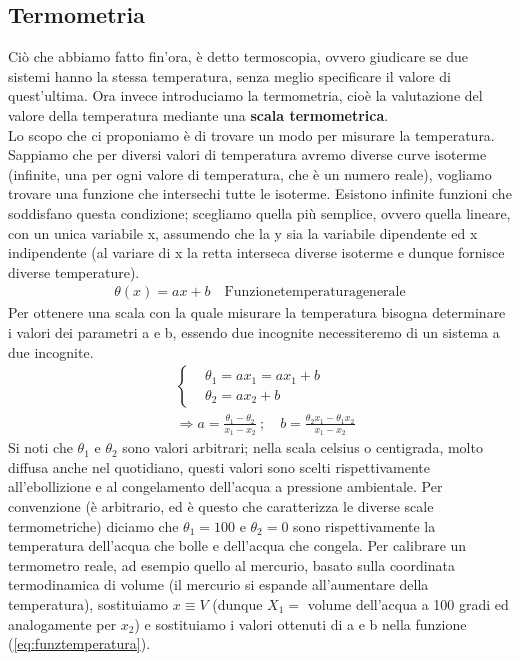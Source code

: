 \documentclass[10pt,a4paper]{article}
\begin{document}
\subsection{Termometria}
Ciò che abbiamo fatto fin'ora, è detto termoscopia, ovvero giudicare se due sistemi hanno la stessa temperatura, senza meglio specificare il valore di quest'ultima. Ora invece introduciamo la termometria, cioè la valutazione del valore della temperatura mediante una \textbf{scala termometrica}. \\
Lo scopo che ci proponiamo è di trovare un modo per misurare la temperatura. Sappiamo che per diversi valori di temperatura avremo diverse curve isoterme (infinite, una per ogni valore di temperatura, che è un numero reale), vogliamo trovare una funzione che intersechi tutte le isoterme. Esistono infinite funzioni che soddisfano questa condizione; scegliamo quella più semplice, ovvero quella lineare, con un unica variabile x, assumendo che la y sia la variabile dipendente ed x indipendente (al variare di x la retta interseca diverse isoterme e dunque fornisce diverse temperature).
\begin{align}\label{eq:funztemperatura}
	\theta (x) = a x + b \quad \text{Funzionetemperaturagenerale}
\end{align}  
Per ottenere una scala con la quale misurare la temperatura bisogna determinare i valori dei parametri a e b, essendo due incognite necessiteremo di un sistema a due incognite. 
\begin{align*} 
&\begin{cases}
	&\theta_1 = a x_1 = a x_1 + b\\
	&\theta_2 = a x_2 + b  
\end{cases}\\
&\Rightarrow a = \frac{\theta_1 - \theta_2}{x_1 - x_2}\ ; \quad b = \frac{\theta_2 x_1 - \theta_1 x_2}{x_1 - x_2 }
\end{align*} 
Si noti che $\theta_1$ e $\theta_2$ sono valori arbitrari; nella scala celsius o centigrada, molto diffusa anche nel quotidiano, questi valori sono scelti rispettivamente all'ebollizione e al congelamento dell'acqua a pressione ambientale. Per convenzione (è arbitrario, ed è questo che caratterizza le diverse scale termometriche) diciamo che $\theta_1 = 100$ e $\theta_2 = 0$ sono rispettivamente la temperatura dell'acqua che bolle e dell'acqua che congela. Per calibrare un termometro reale, ad esempio quello al mercurio, basato sulla coordinata termodinamica di volume (il mercurio si espande all'aumentare della temperatura), sostituiamo $x \equiv V$ (dunque $X_1=$ volume dell'acqua a 100 gradi ed analogamente per $x_2$) e sostituiamo i valori ottenuti di a e b nella funzione (\ref{eq:funztemperatura}).
\end{document}
